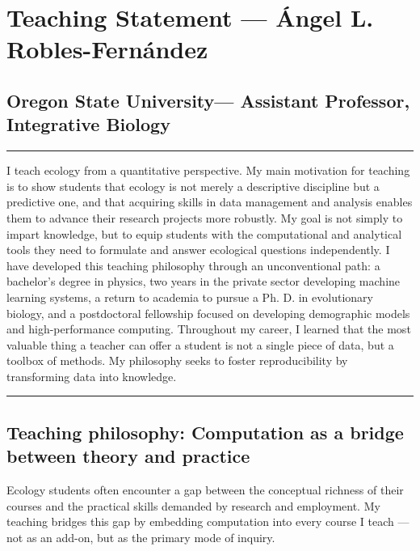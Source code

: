 \documentclass[11pt,letterpaper]{article}
\begin{document}
\section{Teaching Statement --- Ángel L.
Robles-Fernández}\label{teaching-statement-uxe1ngel-l.-robles-fernuxe1ndez}

\subsection*{Oregon State University--- Assistant Professor,
Integrative
Biology}\label{Oregon-state-university-assistant-professor-integrative-biology}

\begin{center}\rule{0.5\linewidth}{0.5pt}\end{center}

I teach ecology from a quantitative perspective. My main motivation for teaching is to show students that ecology is not merely a descriptive discipline but a predictive one, and that acquiring skills in data management and analysis enables them to advance their research projects more robustly. My goal is not simply to impart knowledge, but to
equip students with the computational and analytical tools they need to formulate and answer ecological questions independently. 
I have developed this teaching philosophy through an unconventional path: a bachelor’s degree in physics, two years in the private sector developing machine learning systems, a return to academia to pursue a Ph. D. in evolutionary biology, and a postdoctoral fellowship focused on developing demographic models and high-performance computing. Throughout my career, I learned that the most valuable thing a teacher can offer a student is not a single piece of data, but a toolbox of methods. My philosophy seeks to foster reproducibility by transforming data into knowledge.

\begin{center}\rule{0.5\linewidth}{0.5pt}\end{center}

\subsection*{Teaching philosophy: Computation as a bridge between theory
and
practice}\label{teaching-philosophy-computation-as-a-bridge-between-theory-and-practice}

Ecology students often encounter a gap between the conceptual richness
of their courses and the practical skills demanded by research and
employment. My teaching bridges this gap by embedding computation into every course I teach --- not as an
add-on, but as the primary mode of inquiry.
\end{document}

